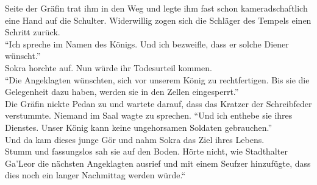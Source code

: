 Seite der Gräfin trat ihm in den Weg und legte ihm fast schon kameradschaftlich eine Hand auf die 
Schulter. Widerwillig zogen sich die Schläger des Tempels einen Schritt zurück.\\
``Ich spreche im Namen des Königs. Und ich bezweifle, dass er solche Diener wünscht.''\\
Sokra horchte auf. Nun würde ihr Todesurteil kommen.\\
``Die Angeklagten wünschten, sich vor unserem König zu rechtfertigen. Bis sie die Gelegenheit 
dazu haben, werden sie in den Zellen eingesperrt.''\\
Die Gräfin nickte Pedan zu und wartete darauf, dass das Kratzer der Schreibfeder verstummte. 
Niemand im Saal wagte zu sprechen. ``Und ich enthebe sie ihres Dienstes. Unser König kann keine 
ungehorsamen Soldaten gebrauchen.''\\
Und da kam dieses junge Gör und nahm Sokra das Ziel ihres Lebens.\\
Stumm und fassungslos sah sie auf den Boden. Hörte nicht, wie Stadthalter Ga'Leor die nächsten 
Angeklagten ausrief und mit einem Seufzer hinzufügte, dass dies noch ein langer Nachmittag werden 
würde.``\\
